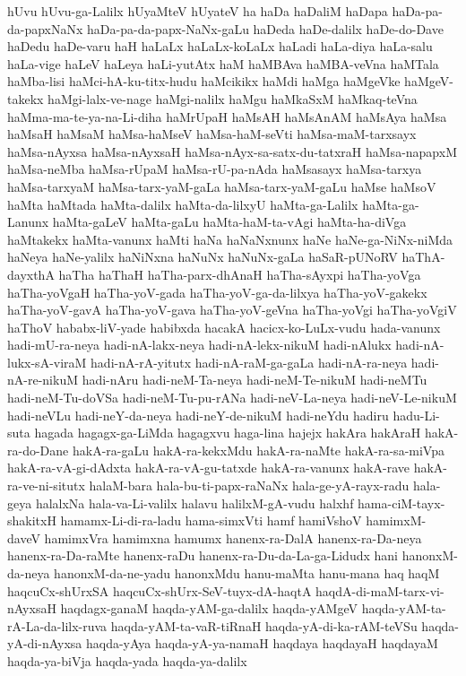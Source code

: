 {hUvu
hUvu-ga-Lalilx
hUyaMteV
hUyateV
ha
haDa
haDaliM
haDapa
haDa-pa-da-papxNaNx
haDa-pa-da-papx-NaNx-gaLu
haDeda
haDe-dalilx
haDe-do-Dave
haDedu
haDe-varu
haH
haLaLx
haLaLx-koLaLx
haLadi
haLa-diya
haLa-salu
haLa-vige
haLeV
haLeya
haLi-yutAtx
haM
haMBAva
haMBA-veVna
haMTala
haMba-lisi
haMci-hA-ku-titx-hudu
haMcikikx
haMdi
haMga
haMgeVke
haMgeV-takekx
haMgi-lalx-ve-nage
haMgi-nalilx
haMgu
haMkaSxM
haMkaq-teVna
haMma-ma-te-ya-na-Li-diha
haMrUpaH
haMsAH
haMsAnAM
haMsAya
haMsa
haMsaH
haMsaM
haMsa-haMseV
haMsa-haM-seVti
haMsa-maM-tarxsayx
haMsa-nAyxsa
haMsa-nAyxsaH
haMsa-nAyx-sa-satx-du-tatxraH
haMsa-napapxM
haMsa-neMba
haMsa-rUpaM
haMsa-rU-pa-nAda
haMsasayx
haMsa-tarxya
haMsa-tarxyaM
haMsa-tarx-yaM-gaLa
haMsa-tarx-yaM-gaLu
haMse
haMsoV
haMta
haMtada
haMta-dalilx
haMta-da-lilxyU
haMta-ga-Lalilx
haMta-ga-Lanunx
haMta-gaLeV
haMta-gaLu
haMta-haM-ta-vAgi
haMta-ha-diVga
haMtakekx
haMta-vanunx
haMti
haNa
haNaNxnunx
haNe
haNe-ga-NiNx-niMda
haNeya
haNe-yalilx
haNiNxna
haNuNx
haNuNx-gaLa
haSaR-pUNoRV
haThA-dayxthA
haTha
haThaH
haTha-parx-dhAnaH
haTha-sAyxpi
haTha-yoVga
haTha-yoVgaH
haTha-yoV-gada
haTha-yoV-ga-da-lilxya
haTha-yoV-gakekx
haTha-yoV-gavA
haTha-yoV-gava
haTha-yoV-geVna
haTha-yoVgi
haTha-yoVgiV
haThoV
hababx-liV-yade
habibxda
hacakA
hacicx-ko-LuLx-vudu
hada-vanunx
hadi-mU-ra-neya
hadi-nA-lakx-neya
hadi-nA-lekx-nikuM
hadi-nAlukx
hadi-nA-lukx-sA-viraM
hadi-nA-rA-yitutx
hadi-nA-raM-ga-gaLa
hadi-nA-ra-neya
hadi-nA-re-nikuM
hadi-nAru
hadi-neM-Ta-neya
hadi-neM-Te-nikuM
hadi-neMTu
hadi-neM-Tu-doVSa
hadi-neM-Tu-pu-rANa
hadi-neV-La-neya
hadi-neV-Le-nikuM
hadi-neVLu
hadi-neY-da-neya
hadi-neY-de-nikuM
hadi-neYdu
hadiru
hadu-Li-suta
hagada
hagagx-ga-LiMda
hagagxvu
haga-lina
hajejx
hakAra
hakAraH
hakA-ra-do-Dane
hakA-ra-gaLu
hakA-ra-kekxMdu
hakA-ra-naMte
hakA-ra-sa-miVpa
hakA-ra-vA-gi-dAdxta
hakA-ra-vA-gu-tatxde
hakA-ra-vanunx
hakA-rave
hakA-ra-ve-ni-situtx
halaM-bara
hala-bu-ti-papx-raNaNx
hala-ge-yA-rayx-radu
hala-geya
halalxNa
hala-va-Li-valilx
halavu
halilxM-gA-vudu
halxhf
hama-ciM-tayx-shakitxH
hamamx-Li-di-ra-ladu
hama-simxVti
hamf
hamiVshoV
hamimxM-daveV
hamimxVra
hamimxna
hamumx
hanenx-ra-DalA
hanenx-ra-Da-neya
hanenx-ra-Da-raMte
hanenx-raDu
hanenx-ra-Du-da-La-ga-Lidudx
hani
hanonxM-da-neya
hanonxM-da-ne-yadu
hanonxMdu
hanu-maMta
hanu-mana
haq
haqM
haqcuCx-shUrxSA
haqcuCx-shUrx-SeV-tuyx-dA-haqtA
haqdA-di-maM-tarx-vi-nAyxsaH
haqdagx-ganaM
haqda-yAM-ga-dalilx
haqda-yAMgeV
haqda-yAM-ta-rA-La-da-lilx-ruva
haqda-yAM-ta-vaR-tiRnaH
haqda-yA-di-ka-rAM-teVSu
haqda-yA-di-nAyxsa
haqda-yAya
haqda-yA-ya-namaH
haqdaya
haqdayaH
haqdayaM
haqda-ya-biVja
haqda-yada
haqda-ya-dalilx
}
